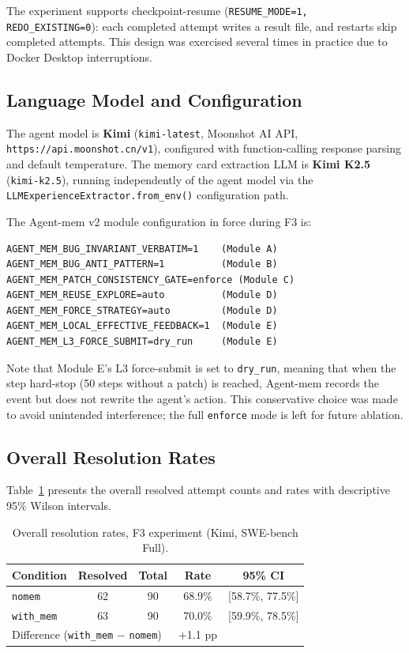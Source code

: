 \documentclass[runningheads]{llncs}
\begin{document}
The experiment supports checkpoint-resume (\texttt{RESUME\_MODE=1, REDO\_EXISTING=0}): each completed attempt writes a result file, and restarts skip completed attempts. This design was exercised several times in practice due to Docker Desktop interruptions.

\subsection{Language Model and Configuration}

The agent model is \textbf{Kimi} (\texttt{kimi-latest}, Moonshot AI API, \texttt{https://api.moonshot.cn/v1}), configured with function-calling response parsing and default temperature. The memory card extraction LLM is \textbf{Kimi K2.5} (\texttt{kimi-k2.5}), running independently of the agent model via the \texttt{LLMExperienceExtractor.from\_env()} configuration path.

The Agent-mem v2 module configuration in force during F3 is:
\begin{verbatim}
AGENT_MEM_BUG_INVARIANT_VERBATIM=1    (Module A)
AGENT_MEM_BUG_ANTI_PATTERN=1          (Module B)
AGENT_MEM_PATCH_CONSISTENCY_GATE=enforce (Module C)
AGENT_MEM_REUSE_EXPLORE=auto          (Module D)
AGENT_MEM_FORCE_STRATEGY=auto         (Module D)
AGENT_MEM_LOCAL_EFFECTIVE_FEEDBACK=1  (Module E)
AGENT_MEM_L3_FORCE_SUBMIT=dry_run     (Module E)
\end{verbatim}

Note that Module E's L3 force-submit is set to \texttt{dry\_run}, meaning that when the step hard-stop (50 steps without a patch) is reached, Agent-mem records the event but does not rewrite the agent's action. This conservative choice was made to avoid unintended interference; the full \texttt{enforce} mode is left for future ablation.

\subsection{Overall Resolution Rates}

Table~\ref{tab:overall} presents the overall resolved attempt counts and rates with descriptive 95\% Wilson intervals.

\begin{table}[h]
\centering
\caption{Overall resolution rates, F3 experiment (Kimi, SWE-bench Full).}
\label{tab:overall}
\begin{tabular}{lcccc}
\toprule
\textbf{Condition} & \textbf{Resolved} & \textbf{Total} & \textbf{Rate} & \textbf{95\% CI} \\
\midrule
\texttt{nomem} & 62 & 90 & 68.9\% & [58.7\%, 77.5\%] \\
\texttt{with\_mem} & 63 & 90 & 70.0\% & [59.9\%, 78.5\%] \\
\midrule
\multicolumn{3}{l}{Difference (\texttt{with\_mem} $-$ \texttt{nomem})} & $+$1.1 pp & \\
\bottomrule
\end{tabular}
\end{table}
\end{document}
